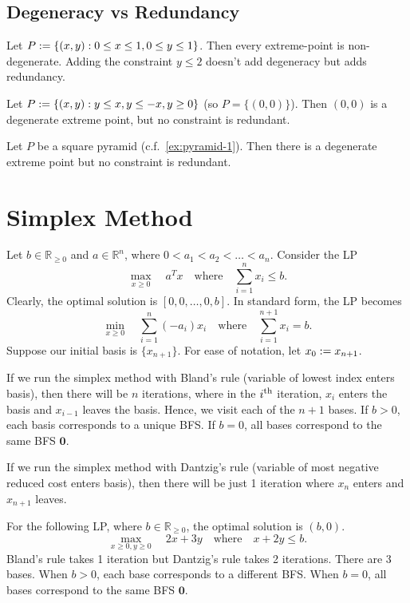 \documentclass[a4paper,12pt,fleqn]{article}
\begin{document}
\subsection{Degeneracy vs Redundancy}

\begin{example}
Let $P := \{(x, y): 0 \le x \le 1, 0 \le y \le 1\}$.
Then every extreme-point is non-degenerate.
Adding the constraint $y \le 2$ doesn't add degeneracy but adds redundancy.
\end{example}

\begin{example}
Let $P := \{(x, y): y \le x, y \le -x, y \ge 0\}$ (so $P = \{(0, 0)\}$).
Then $(0, 0)$ is a degenerate extreme point, but no constraint is redundant.
\end{example}

\begin{example}
Let $P$ be a square pyramid (c.f.~\cref{ex:pyramid-1}).
Then there is a degenerate extreme point but no constraint is redundant.
\end{example}

\section{Simplex Method}

\begin{example}
Let $b \in \mathbb{R}_{\ge 0}$ and $a \in \mathbb{R}^n$, where $0 < a_1 < a_2 < \ldots < a_n$.
Consider the LP \[ \max_{x \ge 0}\quad a^Tx \quad\textrm{where}\quad \sum_{i=1}^n x_i \le b. \]
Clearly, the optimal solution is $[0, 0, \ldots, 0, b]$.
In standard form, the LP becomes
\[ \min_{x \ge 0}\quad \sum_{i=1}^n (-a_i)x_i \quad\textrm{where}\quad \sum_{i=1}^{n+1} x_i = b. \]
Suppose our initial basis is $\{x_{n+1}\}$. For ease of notation, let $x_0 := x_{n+1}$.

If we run the simplex method with Bland's rule (variable of lowest index enters basis),
then there will be $n$ iterations, where in the $i^{\textrm{th}}$ iteration,
$x_i$ enters the basis and $x_{i-1}$ leaves the basis.
Hence, we visit each of the $n+1$ bases.
If $b > 0$, each basis corresponds to a unique BFS.
If $b = 0$, all bases correspond to the same BFS $\mathbf{0}$.

If we run the simplex method with Dantzig's rule (variable of most negative reduced cost enters basis),
then there will be just 1 iteration where $x_n$ enters and $x_{n+1}$ leaves.
\end{example}

\begin{example}
For the following LP, where $b \in \mathbb{R}_{\ge 0}$, the optimal solution is $(b, 0)$.
\[ \max_{x \ge 0, y \ge 0}\quad 2x+3y \quad\textrm{where}\quad x + 2y \le b. \]
Bland's rule takes 1 iteration but Dantzig's rule takes 2 iterations.
There are 3 bases. When $b > 0$, each base corresponds to a different BFS.
When $b = 0$, all bases correspond to the same BFS $\mathbf{0}$.
\end{example}

\end{document}
